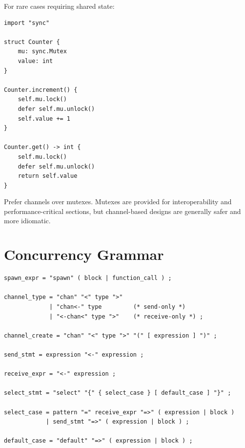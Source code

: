 For rare cases requiring shared state:

\begin{lstlisting}
import "sync"

struct Counter {
    mu: sync.Mutex
    value: int
}

Counter.increment() {
    self.mu.lock()
    defer self.mu.unlock()
    self.value += 1
}

Counter.get() -> int {
    self.mu.lock()
    defer self.mu.unlock()
    return self.value
}
\end{lstlisting}

\begin{warning}
Prefer channels over mutexes. Mutexes are provided for interoperability and performance-critical sections, but channel-based designs are generally safer and more idiomatic.
\end{warning}

\section{Concurrency Grammar}

\begin{lstlisting}[language=EBNF]
spawn_expr = "spawn" ( block | function_call ) ;

channel_type = "chan" "<" type ">"
             | "chan<-" type         (* send-only *)
             | "<-chan<" type ">"    (* receive-only *) ;

channel_create = "chan" "<" type ">" "(" [ expression ] ")" ;

send_stmt = expression "<-" expression ;

receive_expr = "<-" expression ;

select_stmt = "select" "{" { select_case } [ default_case ] "}" ;

select_case = pattern "=" receive_expr "=>" ( expression | block )
            | send_stmt "=>" ( expression | block ) ;

default_case = "default" "=>" ( expression | block ) ;
\end{lstlisting}
